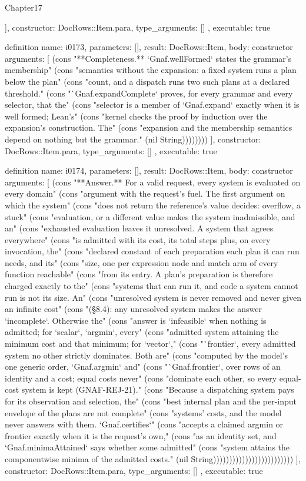 \begin{lexlean}{Chapter17}
\begin{semanticmodule}
{{    ],
    constructor: DocRows::Item.para,
    type_arguments: []
  },
  executable: true
}

definition{
  name: i0173,
  parameters: [],
  result: DocRows::Item,
  body: constructor{
    arguments: [
      (cons "**Completeness.** `Gnaf.wellFormed` states the grammar's membership" (cons "semantics without the expansion: a fixed system runs a plan below the plan" (cons "count, and a dispatch runs two such plans at a declared threshold." (cons "`Gnaf.expandComplete` proves, for every grammar and every selector, that the" (cons "selector is a member of `Gnaf.expand` exactly when it is well formed; Lean's" (cons "kernel checks the proof by induction over the expansion's construction. The" (cons "expansion and the membership semantics depend on nothing but the grammar." (nil String))))))))
    ],
    constructor: DocRows::Item.para,
    type_arguments: []
  },
  executable: true
}

definition{
  name: i0174,
  parameters: [],
  result: DocRows::Item,
  body: constructor{
    arguments: [
      (cons "**Answer.** For a valid request, every system is evaluated on every domain" (cons "argument with the request's fuel. The first argument on which the system" (cons "does not return the reference's value decides: overflow, a stuck" (cons "evaluation, or a different value makes the system inadmissible, and an" (cons "exhausted evaluation leaves it unresolved. A system that agrees everywhere" (cons "is admitted with its cost, its total steps plus, on every invocation, the" (cons "declared constant of each preparation each plan it can run needs, and its" (cons "size, one per expression node and match arm of every function reachable" (cons "from its entry. A plan's preparation is therefore charged exactly to the" (cons "systems that can run it, and code a system cannot run is not its size. An" (cons "unresolved system is never removed and never given an infinite cost" (cons "(§8.4): any unresolved system makes the answer `incomplete`. Otherwise the" (cons "answer is `infeasible` when nothing is admitted; for `scalar`, `argmin`, every" (cons "admitted system attaining the minimum cost and that minimum; for `vector`," (cons "`frontier`, every admitted system no other strictly dominates. Both are" (cons "computed by the model's one generic order, `Gnaf.argmin` and" (cons "`Gnaf.frontier`, over rows of an identity and a cost; equal costs never" (cons "dominate each other, so every equal-cost system is kept (GNAF-REJ-21)." (cons "Because a dispatching system pays for its observation and selection, the" (cons "best internal plan and the per-input envelope of the plans are not complete" (cons "systems' costs, and the model never answers with them. `Gnaf.certifies`" (cons "accepts a claimed argmin or frontier exactly when it is the request's own," (cons "as an identity set, and `Gnaf.minimaAttained` says whether some admitted" (cons "system attains the componentwise minima of the admitted costs." (nil String)))))))))))))))))))))))))
    ],
    constructor: DocRows::Item.para,
    type_arguments: []
  },
  executable: true
}


\end{semanticmodule}
\end{lexlean}
